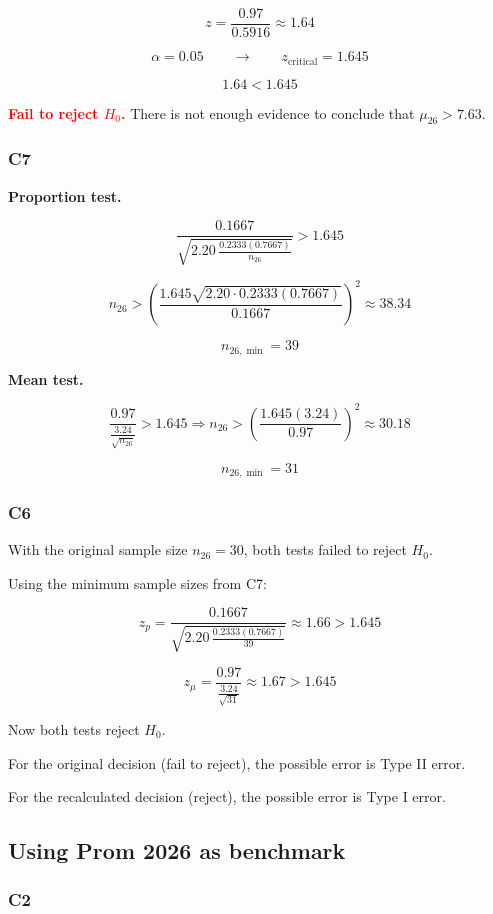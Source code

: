\documentclass[12pt]{article}
\newcommand{\FailDecision}[1]{%
	\textcolor{red}{\textbf{Fail to reject \(H_0\).}} #1%
}
\begin{document}
	\[
	z=
	\frac{0.97}{0.5916}
	\approx
	1.64
	\]
	
	\[
	\alpha=0.05 
	\qquad \longrightarrow \qquad 
	z_{\text{critical}}=1.645
	\]
	
	\[
	1.64<1.645
	\]
	
	\FailDecision{There is not enough evidence to conclude that \(\mu_{26}>7.63\).}
	
	\subsubsection*{C7}

	\textbf{Proportion test.}

	\[
	\frac{0.1667}{\sqrt{2.20\,\frac{0.2333(0.7667)}{n_{26}}}}>1.645
	\]

	\[
	n_{26}>
	\left(
	\frac{1.645\sqrt{2.20\cdot 0.2333(0.7667)}}{0.1667}
	\right)^2
	\approx
	38.34
	\]

	\[
	n_{26,\min}=39
	\]

	\textbf{Mean test.}

	\[
	\frac{0.97}{\frac{3.24}{\sqrt{n_{26}}}}>1.645
	\Rightarrow
	n_{26}>
	\left(\frac{1.645(3.24)}{0.97}\right)^2
	\approx 30.18
	\]

	\[
	n_{26,\min}=31
	\]

	\subsubsection*{C6}

	With the original sample size \(n_{26}=30\), both tests failed to reject \(H_0\).

	Using the minimum sample sizes from C7:

	\[
	z_p=\frac{0.1667}{\sqrt{2.20\,\frac{0.2333(0.7667)}{39}}}\approx 1.66>1.645
	\]

	\[
	z_\mu=\frac{0.97}{\frac{3.24}{\sqrt{31}}}\approx 1.67>1.645
	\]

	Now both tests reject \(H_0\).

	For the original decision (fail to reject), the possible error is Type II error.

	For the recalculated decision (reject), the possible error is Type I error.

	\subsection*{Using Prom 2026 as benchmark}
	
	\subsubsection*{C2}
	
\end{document}
